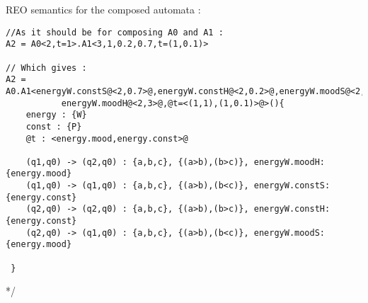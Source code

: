 \documentclass{article}
\begin{document}
\newpage
\noindent
REO semantics for the composed automata :
\begin{lstlisting}[frame=single,style=base] 
//As it should be for composing A0 and A1 :
A2 = A0<2,t=1>.A1<3,1,0.2,0.7,t=(1,0.1)>

// Which gives :
A2 = A0.A1<energyW.constS@<2,0.7>@,energyW.constH@<2,0.2>@,energyW.moodS@<2,2>@,
           energyW.moodH@<2,3>@,@t=<(1,1),(1,0.1)>@>(){
    energy : {W}
    const : {P}
    @t : <energy.mood,energy.const>@

    (q1,q0) -> (q2,q0) : {a,b,c}, {(a>b),(b>c)}, energyW.moodH:{energy.mood}
    (q1,q0) -> (q1,q0) : {a,b,c}, {(a>b),(b<c)}, energyW.constS:{energy.const}
    (q2,q0) -> (q2,q0) : {a,b,c}, {(a>b),(b>c)}, energyW.constH:{energy.const}
    (q2,q0) -> (q1,q0) : {a,b,c}, {(a>b),(b<c)}, energyW.moodS:{energy.mood}

 }
\end{lstlisting}
\iffalse
    (1) edge node [left] {0.6} (4)
        edge [bend right] node[left] {0.3} (2)
        edge [loop above] node {0.1} (1)

    (2) edge node [right] {0.4} (1)
        edge node {0.3} (4)
        edge [loop left] node {0.4} (2)
        edge [bend right] node[left] {0.1} (3)

    (3) edge node [right] {0.8} (2)
        edge [bend right] node[right] {0.2} (4)

    (4) edge node [left] {0.2} (3)
        edge [loop right] node {0.6} (4)
        edge [bend right] node[right] {0.2} (1);
    Define styles for edges, arrows, and nodes
        circle style for the main nodes, and font options so we don't need to adjust fonts within the nodes
        For arrows, we use stealth' which is the name for a kind of arrow tip and shorten to not touch the node
        The option auto is useful for automatic placement of nodes next to edges, instead of sitting directly on the edge. As we will mostly use left and right options, it will have effect just for one node. But good to have it as general option in the scope.
    Place the main nodes
    Draw edges with nodes for description
    Use options loop and bend for loops and bent edges
    Specify left and right for bend direction and node placement
\fi
*/
\end{document}
